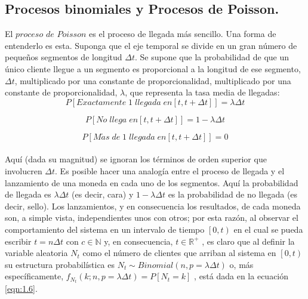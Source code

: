 \subsection {Procesos binomiales y Procesos de Poisson.}
El $proceso$ $de$ $Poisson$ es el proceso de llegada más sencillo. Una forma de entenderlo es esta. Suponga que el eje temporal se divide en un gran número de pequeños segmentos de longitud
$ \Delta t $. Se supone que la probabilidad de que un único cliente llegue a un segmento es proporcional a la
longitud de ese segmento,$ \Delta t $, multiplicado por una constante de proporcionalidad, multiplicado por una constante de proporcionalidad, $ \lambda $, que representa la tasa media de llegadas:
\begin{equation}
    P\left [ Exactamente \; 1 \; llegada \;en \left [ t,t+\Delta t \right ] \right ] = \lambda \Delta t
    \label{eqn:1.3}
\end{equation}

\begin{equation}
    P\left [ No \;llega \;en  \left [ t,t+\Delta t \right ] \right ] = 1-\lambda \Delta t
    \label{eqn:1.4}
\end{equation}

\begin{equation}
    P\left [ M\acute{a}s\; de \; 1 \; llegada\; en  \left [ t,t+\Delta t \right ] \right ] = 0
    \label{eqn:1.5}
\end{equation}
\\
Aquí (dada su magnitud) se ignoran los términos de orden superior que involucren $ \Delta t $. Es posible hacer una analogía entre el proceso de llegada y el lanzamiento de una moneda en cada uno de los segmentos. Aquí la probabilidad de llegada es $ \lambda \Delta t $ (es decir, cara) y $1-\lambda \Delta t$ es la probabilidad de
no llegada (es decir, sello). Los lanzamientos, y en consecuencia los resultados, de cada moneda son, a simple vista, independientes unos con otros; por esta razón, al observar el comportamiento del sistema en un intervalo de tiempo $\left [ 0,t \right )$ en el cual se pueda escribir $t = n\Delta t $ con $ c \in \mathbb{N} $ y, en consecuencia, $ t \in \mathbb{R}^{+} $ , es claro que al definir la variable aleatoria $ N_{t} $ como el número de clientes que arriban al sistema en $ \left [ 0,t \right ) $ su estructura probabilística es $ N_{t} \sim Binomial \left ( n,p=\lambda \Delta t \right ) $ o, más específicamente, $ f_{N_{t}}\left ( k;n,p=\lambda \Delta t \right ) = P \left [ N_{t} = k \right ] $ , está dada en la ecuación \ref{eqn:1.6}.

